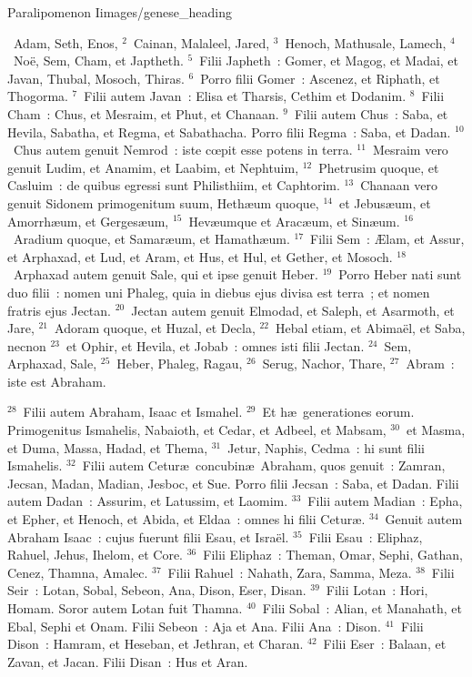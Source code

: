 {Paralipomenon I}{images/genese_heading}

~\lettrine[lines=10,image=true,loversize=0.05,lraise=-0.03]{A}{}dam, Seth, Enos,
${}^{2}$~Cainan, Malaleel, Jared,
${}^{3}$~Henoch, Mathusale, Lamech,
${}^{4}$~No\"e, Sem, Cham, et Japtheth.
${}^{5}$~Filii Japheth~: Gomer, et Magog, et Madai, et Javan, Thubal, Mosoch, Thiras.
${}^{6}$~Porro filii Gomer~: Ascenez, et Riphath, et Thogorma.
${}^{7}$~Filii autem Javan~: Elisa et Tharsis, Cethim et Dodanim.
${}^{8}$~Filii Cham~: Chus, et Mesraim, et Phut, et Chanaan.
${}^{9}$~Filii autem Chus~: Saba, et Hevila, Sabatha, et Regma, et Sabathacha. Porro filii Regma~: Saba, et Dadan.
${}^{10}$~Chus autem genuit Nemrod~: iste cœpit esse potens in terra.
${}^{11}$~Mesraim vero genuit Ludim, et Anamim, et Laabim, et Nephtuim,
${}^{12}$~Phetrusim quoque, et Casluim~: de quibus egressi sunt Philisthiim, et Caphtorim.
${}^{13}$~Chanaan vero genuit Sidonem primogenitum suum, Heth\ae um quoque,
${}^{14}$~et Jebus\ae um, et Amorrh\ae um, et Gerges\ae um,
${}^{15}$~Hev\ae umque et Arac\ae um, et Sin\ae um.
${}^{16}$~Aradium quoque, et Samar\ae um, et Hamath\ae um.
${}^{17}$~Filii Sem~: \AE lam, et Assur, et Arphaxad, et Lud, et Aram, et Hus, et Hul, et Gether, et Mosoch.
${}^{18}$~Arphaxad autem genuit Sale, qui et ipse genuit Heber.
${}^{19}$~Porro Heber nati sunt duo filii~: nomen uni Phaleg, quia in diebus ejus divisa est terra~; et nomen fratris ejus Jectan.
${}^{20}$~Jectan autem genuit Elmodad, et Saleph, et Asarmoth, et Jare,
${}^{21}$~Adoram quoque, et Huzal, et Decla,
${}^{22}$~Hebal etiam, et Abima\"el, et Saba, necnon
${}^{23}$~et Ophir, et Hevila, et Jobab~: omnes isti filii Jectan.
${}^{24}$~Sem, Arphaxad, Sale,
${}^{25}$~Heber, Phaleg, Ragau,
${}^{26}$~Serug, Nachor, Thare,
${}^{27}$~Abram~: iste est Abraham.


${}^{28}$~Filii autem Abraham, Isaac et Ismahel.
${}^{29}$~Et h\ae\ generationes eorum. Primogenitus Ismahelis, Nabaioth, et Cedar, et Adbeel, et Mabsam,
${}^{30}$~et Masma, et Duma, Massa, Hadad, et Thema,
${}^{31}$~Jetur, Naphis, Cedma~: hi sunt filii Ismahelis.
${}^{32}$~Filii autem Cetur\ae\ concubin\ae\ Abraham, quos genuit~: Zamran, Jecsan, Madan, Madian, Jesboc, et Sue. Porro filii Jecsan~: Saba, et Dadan. Filii autem Dadan~: Assurim, et Latussim, et Laomim.
${}^{33}$~Filii autem Madian~: Epha, et Epher, et Henoch, et Abida, et Eldaa~: omnes hi filii Cetur\ae .
${}^{34}$~Genuit autem Abraham Isaac~: cujus fuerunt filii Esau, et Isra\"el.
${}^{35}$~Filii Esau~: Eliphaz, Rahuel, Jehus, Ihelom, et Core.
${}^{36}$~Filii Eliphaz~: Theman, Omar, Sephi, Gathan, Cenez, Thamna, Amalec.
${}^{37}$~Filii Rahuel~: Nahath, Zara, Samma, Meza.
${}^{38}$~Filii Seir~: Lotan, Sobal, Sebeon, Ana, Dison, Eser, Disan.
${}^{39}$~Filii Lotan~: Hori, Homam. Soror autem Lotan fuit Thamna.
${}^{40}$~Filii Sobal~: Alian, et Manahath, et Ebal, Sephi et Onam. Filii Sebeon~: Aja et Ana. Filii Ana~: Dison.
${}^{41}$~Filii Dison~: Hamram, et Heseban, et Jethran, et Charan.
${}^{42}$~Filii Eser~: Balaan, et Zavan, et Jacan. Filii Disan~: Hus et Aran.


